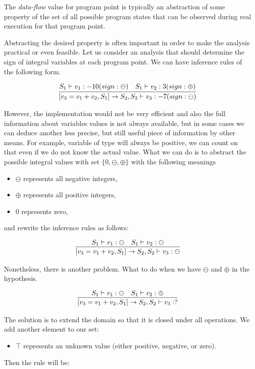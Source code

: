         The \emph{data-flow} value for program point is typically an abstraction 
        of some property of the set of all possible program states that can be 
        observed during real execution for that program point. 
        
        Abstracting the desired property is often important in order to make 
        the analysis practical or even feasible. Let us consider an analysis 
        that should determine the sign of integral variables at each program point.
        We can have inference rules of the following form.
        
        $$
        \infer{[v_3=v_1+v_2, S_1] \rightarrow S_2, S_2 \vdash v_3 : -7 (sign: \ominus)}
        {S_1 \vdash v_1 : -10 (sign: \ominus) & S_1 \vdash v_2 : 3 (sign: \oplus)}
        $$
        
        However, the implementation would not be very efficient and also the full 
        information about variables values is not always available, but in some cases 
        we can deduce another less precise, but still useful piece of information 
        by other means. For example, variable of type  will 
        always be positive, we can count on that even if we do not know the actual value. 
        What we can do is to abstract the possible integral values with set 
        $\{0, \ominus, \oplus\}$ with the following meanings         
        \begin{itemize}
            \item $\ominus$ represents all negative integers,
            \item $\oplus$ represents all positive integers,
            \item $0$ represents zero,
        \end{itemize}                
        and rewrite the inference rules as follows:
        
        $$
        \infer{[v_3=v_1+v_2, S_1] \rightarrow S_2, S_2 \vdash v_3 : \ominus}
        {S_1 \vdash v_1 : \ominus & S_1 \vdash v_2 : \ominus}
        $$
        
        Nonetheless, there is another problem. What to do when we have $\ominus$ 
        and $\oplus$ in the hypothesis.
        
        $$
        \infer{[v_3=v_1+v_2, S_1] \rightarrow S_2, S_2 \vdash v_3 : ?}
        {S_1 \vdash v_1 : \ominus & S_1 \vdash v_2 : \oplus}
        $$
        
        The solution is to extend the domain so that it is closed under all operations. 
        We add another element to our set:
        \begin{itemize}
            \item $\top$ represents an unknown value (either positive, negative, or zero).
        \end{itemize}
        Then the rule will be:
        
